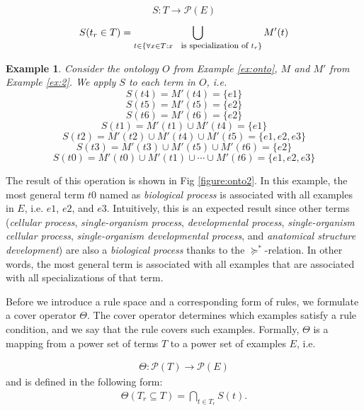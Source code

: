 \documentclass{bmcart}
\newtheorem{example}{Example}
\begin{document}

 $$S :  T \rightarrow \mathcal{P}(E)$$
\begin{eqnarray}
\label{eq:mapS}
	 S(t_{r} \in T) = \bigcup\limits_{t \in \{\forall x \in T: x \textup{ \footnotesize is specialization of } t_{r}\}}^{} M'(t)
\end{eqnarray}

\begin{example}\label{ex:3}
    Consider the ontology $O$ from Example \ref{ex:onto}, $M$ and $M'$ from Example \ref{ex:2}. We apply $S$ to each term in $O$, i.e.
    $$S(t4) = M'(t4) = \{e1\}$$
    $$S(t5) = M'(t5) = \{e2\}$$
    $$S(t6) = M'(t6) = \{e2\}$$
    $$S(t1) = M'(t1) \cup M'(t4) = \{e1\}$$
    $$S(t2) = M'(t2) \cup M'(t4) \cup M'(t5) = \{e1, e2, e3\}$$
    $$S(t3) = M'(t3) \cup M'(t5) \cup M'(t6) = \{e2\}$$
    $$S(t0) = M'(t0) \cup M'(t1) \cup \cdots \cup M'(t6) = \{e1, e2, e3\}$$
    
\end{example}
The result of this operation is shown in Fig \ref{figure:onto2}. In this example, the most general term $t0$ named as \emph{biological process} is associated with all examples in $E$, i.e. $e1$, $e2$, and $e3$. Intuitively, this is an expected result since other terms (\emph{cellular process}, \emph{single-organism process}, \emph{developmental process}, \emph{single-organism cellular process}, \emph{single-organism developmental process}, and \emph{anatomical structure development}) are also a \emph{biological process} thanks to the $\succeq^{*}$-relation. In other words, the most general term is associated with all examples that are associated with all specializations of that term.


Before we introduce a rule space and a corresponding form of rules, we formulate a cover operator $\Theta$. The cover operator determines which examples satisfy a rule condition, and we say that the rule covers such examples. Formally, $\Theta$ is a mapping from a power set of terms $T$ to a power set of examples $E$, i.e.

\begin{eqnarray}
\label{eq:thetamap}
	 \Theta : \mathcal{P}(T) \rightarrow \mathcal{P}(E)
\end{eqnarray}
 and is defined in the following form:
\begin{eqnarray} \label{eq:cover}
    \Theta (T_{r} \subseteq T) = \bigcap\limits_{t \in T_{r}} S(t) .
\end{eqnarray}
 
\end{document}
